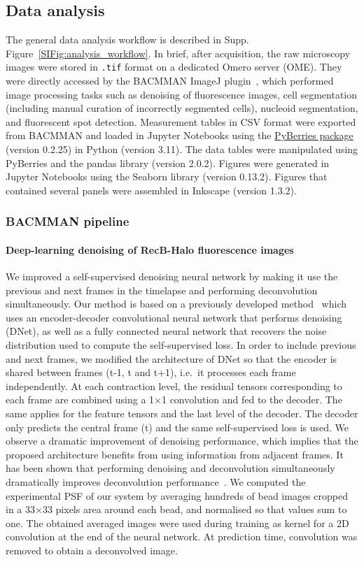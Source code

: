 \subsection*{Data analysis}
The general data analysis workflow is described in Supp. Figure~\ref{SIFig:analysis_workflow}. In brief, after acquisition, the raw microscopy images were stored in \texttt{.tif} format on a dedicated Omero server (OME). They were directly accessed by the BACMMAN ImageJ plugin~\cite{Ollion2019}, which performed image processing tasks such as denoising of fluorescence images, cell segmentation (including manual curation of incorrectly segmented cells), nucleoid segmentation, and fluorescent spot detection. Measurement tables in CSV format were exported from BACMMAN and loaded in Jupyter Notebooks using the \href{https://gitlab.com/MEKlab/pyberries}{PyBerries package} (version 0.2.25) in Python (version 3.11). The data tables were manipulated using PyBerries and the pandas library (version 2.0.2). Figures were generated in Jupyter Notebooks using the Seaborn library (version 0.13.2). Figures that contained several panels were assembled in Inkscape (version 1.3.2).

\subsubsection*{BACMMAN pipeline}
\paragraph*{Deep-learning denoising of RecB-Halo fluorescence images}
We improved a self-supervised denoising neural network by making it use the previous and next frames in the timelapse and performing deconvolution simultaneously. Our method is based on a previously developed method~\cite{Ollion2021} which uses an encoder-decoder convolutional neural network that performs denoising (DNet), as well as a fully connected neural network that recovers the noise distribution used to compute the self-supervised loss. In order to include previous and next frames, we modified the architecture of DNet so that the encoder is shared between frames (t-1, t and t+1), i.e.\ it processes each frame independently. At each contraction level, the residual tensors corresponding to each frame are combined using a 1$\times$1 convolution and fed to the decoder. The same applies for the feature tensors and the last level of the decoder. The decoder only predicts the central frame (t) and the same self-supervised loss is used. We observe a dramatic improvement of denoising performance, which implies that the proposed architecture benefits from using information from adjacent frames. It has been shown that performing denoising and deconvolution simultaneously dramatically improves deconvolution performance~\cite{Kobayashi2020}. We computed the experimental PSF of our system by averaging hundreds of bead images cropped in a 33$\times$33 pixels area around each bead, and normalised so that values sum to one. The obtained averaged images were used during training as kernel for a 2D convolution at the end of the neural network. At prediction time, convolution was removed to obtain a deconvolved image.

